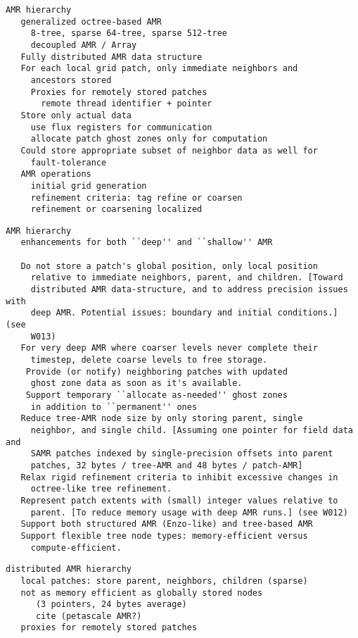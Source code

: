 \documentclass{article}
\begin{document}
\begin{verbatim}
AMR hierarchy
   generalized octree-based AMR 
     8-tree, sparse 64-tree, sparse 512-tree
     decoupled AMR / Array
   Fully distributed AMR data structure
   For each local grid patch, only immediate neighbors and
     ancestors stored
     Proxies for remotely stored patches
       remote thread identifier + pointer
   Store only actual data
     use flux registers for communication
     allocate patch ghost zones only for computation
   Could store appropriate subset of neighbor data as well for
     fault-tolerance
   AMR operations
     initial grid generation
     refinement criteria: tag refine or coarsen
     refinement or coarsening localized
\end{verbatim}

\begin{verbatim}
AMR hierarchy
   enhancements for both ``deep'' and ``shallow'' AMR

   Do not store a patch's global position, only local position
     relative to immediate neighbors, parent, and children. [Toward
     distributed AMR data-structure, and to address precision issues with
     deep AMR. Potential issues: boundary and initial conditions.] (see
     W013)
   For very deep AMR where coarser levels never complete their
     timestep, delete coarse levels to free storage.
    Provide (or notify) neighboring patches with updated
     ghost zone data as soon as it's available.
    Support temporary ``allocate as-needed'' ghost zones
     in addition to ``permanent'' ones
   Reduce tree-AMR node size by only storing parent, single
     neighbor, and single child. [Assuming one pointer for field data and
     SAMR patches indexed by single-precision offsets into parent
     patches, 32 bytes / tree-AMR and 48 bytes / patch-AMR]
   Relax rigid refinement criteria to inhibit excessive changes in
     octree-like tree refinement.
   Represent patch extents with (small) integer values relative to
     parent. [To reduce memory usage with deep AMR runs.] (see W012)
   Support both structured AMR (Enzo-like) and tree-based AMR
   Support flexible tree node types: memory-efficient versus
     compute-efficient.
\end{verbatim}

\begin{verbatim}
distributed AMR hierarchy
   local patches: store parent, neighbors, children (sparse)
   not as memory efficient as globally stored nodes 
      (3 pointers, 24 bytes average)
      cite (petascale AMR?)
   proxies for remotely stored patches
\end{verbatim}
\end{document}

